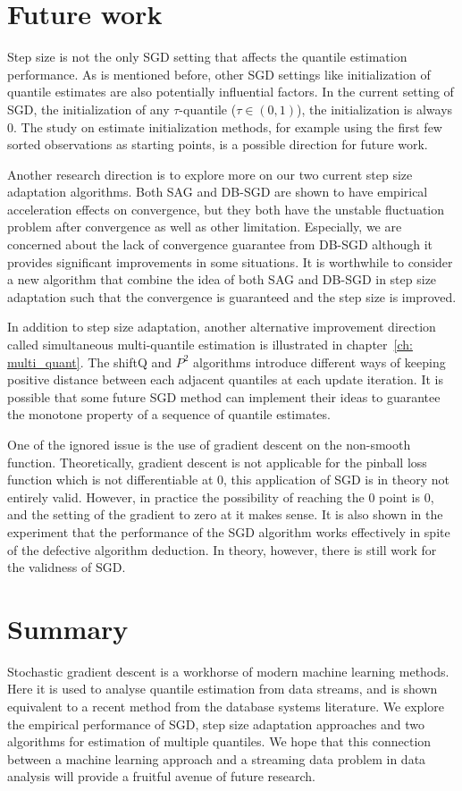\section{Future work}

Step size is not the only SGD setting that affects the quantile estimation performance. As is mentioned before, other SGD settings like initialization of quantile estimates are also potentially influential factors. In the current setting of SGD, the initialization of any $\tau$-quantile ($\tau \in (0,1)$), the initialization is always $0$. The study on estimate initialization methods, for example using the first few sorted observations as starting points, is a possible direction for future work.

Another research direction is to explore more on our two current step size adaptation algorithms. Both SAG and DB-SGD are shown to have empirical acceleration effects on convergence, but they both have the unstable fluctuation problem after convergence as well as other limitation. Especially, we are concerned about the lack of convergence guarantee from DB-SGD although it provides significant improvements in some situations. It is worthwhile to consider a new algorithm that combine the idea of both SAG and DB-SGD in step size adaptation such that the convergence is guaranteed and the step size is improved.

In addition to step size adaptation, another alternative improvement direction called simultaneous multi-quantile estimation is illustrated in chapter~\ref{ch: multi_quant}. 
The shiftQ and $P^2$ algorithms introduce different ways of keeping positive distance between each adjacent quantiles at each update iteration. It is possible that some future SGD method can implement their ideas to guarantee the monotone property of a sequence of quantile estimates.

One of the ignored issue is the use of gradient descent on the non-smooth function. Theoretically, gradient descent is not applicable for the pinball loss function which is not differentiable at $0$, this application of SGD is in theory not entirely valid. However, in practice the possibility of reaching the $0$ point is $0$, and the setting of the gradient to zero at it makes sense. It is also shown in the experiment that the performance of the SGD algorithm works effectively in spite of the defective algorithm deduction. In theory, however, there is still work for the validness of SGD.


\section{Summary}
Stochastic gradient descent is a workhorse of modern machine learning methods. Here it is used to analyse quantile estimation from data streams, and is shown equivalent to a recent method from the database systems literature. We explore the empirical performance of SGD, step size adaptation approaches and two algorithms for estimation of multiple quantiles. We hope that this connection between a machine learning approach and a streaming data problem in data analysis will provide a fruitful avenue of future research.
